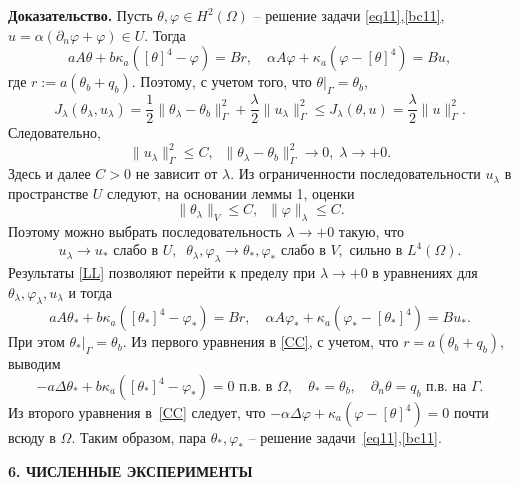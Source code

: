 \documentclass[12pt]{article}
\begin{document}
        {\bf Доказательство.}
    Пусть $\theta,\varphi\in H^2(\Omega)$ -- решение задачи \eqref{eq11},\eqref{bc11},
    $u=\alpha(\partial_n\varphi+\varphi)\in U.$ Тогда
    \[
        a A \theta + b \kappa_a ([\theta]^4 - \varphi ) = Br,\quad
        \alpha A \varphi + \kappa_a (\varphi - [\theta]^4)  = Bu,
    \]
    где $r:=a(\theta_b+q_b).$ Поэтому, с учетом того, что $\theta|_\Gamma=\theta_b$,
    \[
        J_\lambda(\theta_\lambda, u_\lambda) = \frac{1}{2}\|\theta_\lambda -\theta_b\|^2_\Gamma
        + \frac{\lambda}{2}\|u_\lambda\|^2_\Gamma\leq J_\lambda(\theta, u)=\frac{\lambda}{2}\|u\|^2_\Gamma.
    \]
    Следовательно,
    \[
        \|u_\lambda\|^2_\Gamma\leq C,\;\; \|\theta_\lambda -\theta_b\|^2_\Gamma\to 0,\; \lambda\to +0.
    \]
    Здесь и далее $C>0$ не зависит от $\lambda.$
    Из ограниченности последовательности $u_\lambda$ в пространстве $U$ следуют, на основании
    леммы 1, оценки
    \[
        \|\theta_\lambda\|_V \leq C,\;\;
        \|\varphi\|_\lambda \leq C.
    \]
    Поэтому можно выбрать последовательность $\lambda\to+0$ такую, что
    \begin{equation}
        \label{LL}
        u_\lambda \rightarrow u_* \text{  слабо в } U, \;\;
        \theta_\lambda, \varphi_\lambda \rightarrow \theta_*,\varphi_*
        \text{ слабо в } V, \text{ сильно в } L^4(\Omega).
    \end{equation}
    Результаты \eqref{LL} позволяют перейти к пределу при $\lambda\to+0$
    в уравнениях для $\theta_\lambda,\varphi_\lambda,u_\lambda$ и тогда
    \begin{equation}
        \label{CC}
        a A \theta_* + b \kappa_a ([\theta_*]^4 - \varphi_* ) = Br,\quad
        \alpha A \varphi_* + \kappa_a (\varphi_* - [\theta_*]^4)  = Bu_*.
    \end{equation}
    При этом $\theta_*|_\Gamma=\theta_b.$
    Из первого уравнения в \eqref{CC}, с учетом, что $r=a(\theta_b+q_b)$,
    выводим
    \[
        - a\Delta\theta_* + b\kappa_a([\theta_*]^4- \varphi_*)=0 \text{ п.в. в }\Omega,\quad \theta_*=\theta_b,\quad \partial_n\theta = q_b \text{ п.в. на  }\Gamma.
    \]
    Из второго уравнения в~\eqref{CC} следует, что $-\alpha \Delta \varphi +
    \kappa_a(\varphi-[\theta]^4)=0$ почти всюду в $\Omega.$ Таким образом,
    пара $\theta_*,\varphi_*$ -- решение задачи~\eqref{eq11},\eqref{bc11}.

    \begin{center}
        \textbf{6. ЧИСЛЕННЫЕ ЭКСПЕРИМЕНТЫ}
    \end{center}
\end{document}
